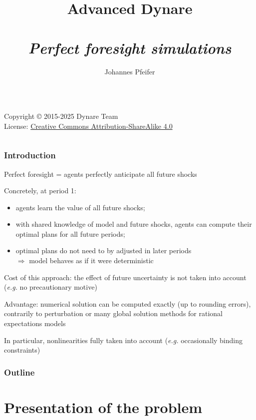 \documentclass[handout,usepdftitle=false,xcolor=dvipsnames,aspectratio=169]{beamer}
\title[]{\textbf{Advanced Dynare\\}
\medskip{Chapter XI}\\
\emph{Perfect foresight simulations}
}
\author{Johannes Pfeifer}
\begin{document}
\begin{frame}
  \titlepage
  \begin{columns}[T]

    \ccbysa
    \tiny
    Copyright © 2015-2025 Dynare Team \\
    License: \href{http://creativecommons.org/licenses/by-sa/4.0/}{Creative
      Commons Attribution-ShareAlike 4.0}
  \end{columns}
\end{frame}

\begin{frame}
  \frametitle{Introduction}
  \begin{witemize}
    \item Perfect foresight = agents perfectly anticipate all future shocks
    \item Concretely, at period 1:
    \begin{itemize}
      \item agents learn the value of all future shocks;
      \item with shared knowledge of model and future shocks,
            agents can compute their optimal plans for all future periods;
      \item optimal plans do not need to by adjusted in later periods\\
            $\Rightarrow$ model behaves as if it were deterministic
    \end{itemize}
    \item Cost of this approach: the effect of future uncertainty is not taken
    into account (\textit{e.g.} no precautionary motive)
    \item Advantage: numerical solution can be computed exactly (up to rounding
    errors), contrarily to perturbation or many global solution methods for rational
    expectations models
    \item In particular, nonlinearities fully taken into account (\textit{e.g.}
    occasionally binding constraints)
  \end{witemize}
\end{frame}

\begin{frame}
  \frametitle{Outline}
  \tableofcontents
\end{frame}

\section[Problem]{Presentation of the problem}
\end{document}
